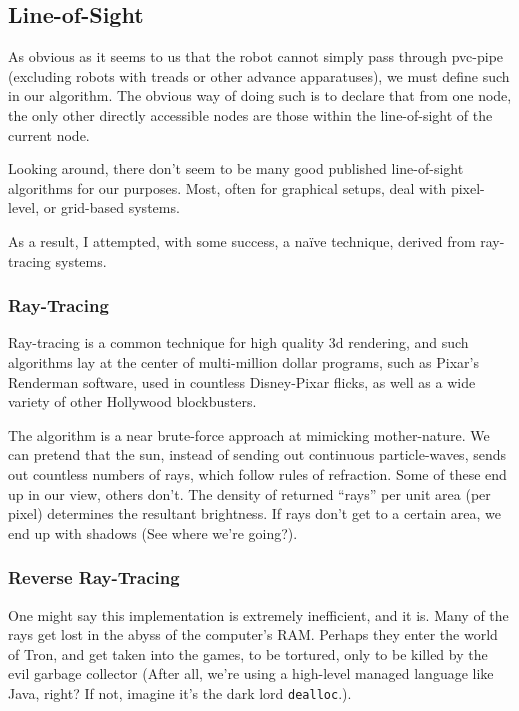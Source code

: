 \documentclass[letterpaper, 12pt]{article}
\begin{document}
\begin{multicols}{2}
\subsection{Line-of-Sight}

As obvious as it seems to us that the robot cannot simply pass through pvc-pipe
(excluding robots with treads or other advance apparatuses), we must define such
in our algorithm. The obvious way of doing such is to declare that from one
node, the only other directly accessible nodes are those within the
line-of-sight of the current node.

Looking around, there don't seem to be many good published line-of-sight
algorithms for our purposes. Most, often for graphical setups, deal with
pixel-level, or grid-based systems. \cite{tilelos}

As a result, I attempted, with some success, a na\"ive technique, derived from
ray-tracing systems.

\subsubsection{Ray-Tracing}

Ray-tracing is a common technique for high quality 3d rendering, and such
algorithms lay at the center of multi-million dollar programs, such as Pixar's
Renderman software, used in countless Disney-Pixar flicks, as well as a wide
variety of other Hollywood blockbusters. \cite{renderman}

The algorithm is a near brute-force approach at mimicking mother-nature. We can
pretend that the sun, instead of sending out continuous particle-waves, sends
out countless numbers of rays, which follow rules of refraction. Some of these
end up in our view, others don't. The density of returned ``rays'' per unit area
(per pixel) determines the resultant brightness. If rays don't get to a certain
area, we end up with shadows (See where we're going?). \cite{radraytrace}

\subsubsection{Reverse Ray-Tracing}

One might say this implementation is extremely inefficient, and it is. Many of
the rays get lost in the abyss of the computer's RAM. Perhaps they enter the
world of Tron, and get taken into the games, to be tortured, only to be killed
by the evil garbage collector (After all, we're using a high-level managed
language like Java, right? If not, imagine it's the dark lord
\texttt{dealloc}.).


\end{multicols}
\end{document}
